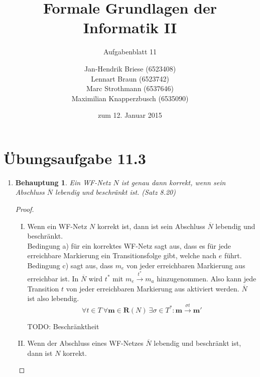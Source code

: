 \documentclass[a4paper]{scrartcl}
\title{Formale Grundlagen der Informatik II}
\subtitle{Aufgabenblatt 11}
\author{
    Jan-Hendrik Briese (6523408) \\
    Lennart Braun (6523742) \\
    Marc Strothmann (6537646) \\
    Maximilian Knapperzbusch (6535090)
}
\date{zum 12. Januar 2015}
\newtheorem*{behaupt}{Behauptung}
\begin{document}
\maketitle

\section*{Übungsaufgabe 11.3} 
\begin{enumerate}
    \item
        \begin{behaupt}
            Ein WF-Netz $N$ ist genau dann korrekt, wenn sein Abschluss
            $\overline{N}$ lebendig und beschränkt ist. (Satz 8.20)
        \end{behaupt}
        \begin{proof} \hfill \\
            \begin{enumerate}[I.]
                \item
                    Wenn ein WF-Netz $N$ korrekt ist, dann ist sein Abschluss
                    $\overline{N}$ lebendig und beschränkt. \\
                    Bedingung a) für ein korrektes WF-Netz sagt aus, dass es
                    für jede erreichbare Markierung ein Transitionsfolge gibt,
                    welche nach $e$ führt.
                    Bedingung c) sagt aus, dass $m_e$ von jeder erreichbaren
                    Markierung aus erreichbar ist.
                    In $\overline{N}$ wird $t^*$ mit
                    $m_e \stackrel{t^*}{\longrightarrow} m_a$ hinzugenommen.
                    Also kann jede Transition $t$ von jeder erreichbaren
                    Markierung aus aktiviert werden.
                    $\overline{N}$ ist also lebendig.
                    \begin{equation}
                        \forall t \in T \ 
                        \forall \textbf{m} \in \textbf{R}(N) \ 
                        \exists \sigma \in T^*
                        : \textbf{m} \stackrel{\sigma t}{\longrightarrow}
                        \textbf{m}'
                    \end{equation}

                    TODO: Beschränktheit
                    

                \item
                    Wenn der Abschluss eines WF-Netzes $\overline{N}$ lebendig
                    und beschränkt ist, dann ist $N$ korrekt. \\


\end{enumerate}
\end{proof}
\end{enumerate}
\end{document}
